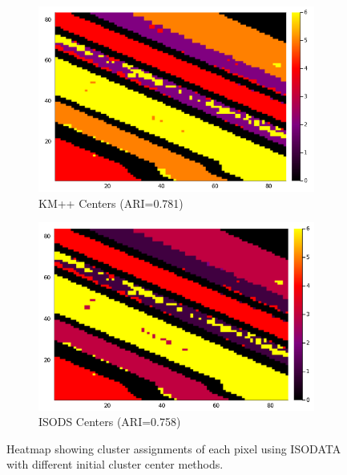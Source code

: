 \documentclass[a4paper,10pt]{article}
\begin{document}
\begin{figure}[ht]
\begin{subfigure}[b]{0.4\textwidth}
            \includegraphics[width=\linewidth]{kisodata.png}
            \caption{KM++ Centers (ARI=0.781)}
            \label{fig:salinask}
      \end{subfigure}
      \begin{subfigure}[b]{0.4\textwidth}
            \centering
            \includegraphics[width=\linewidth]{iisodata.png}
            \caption{ISODS Centers (ARI=0.758)}
            \label{fig:salinasi}
      \end{subfigure}\hfill \caption{Heatmap showing cluster assignments of each
            pixel using ISODATA with different initial cluster center methods.}
      \label{fig:salinas}
\end{figure}
\end{document}
